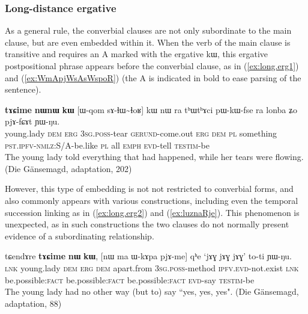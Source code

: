 \documentclass[oldfontcommands,oneside,a4paper,11pt]{article}
\newcommand{\ipa}[1]{{\phon \mbox{#1}}} %
\newcommand{\refb}[1]{(\ref{#1})}
\begin{document}
\subsubsection{Long-distance ergative}
As a general rule, the converbial clauses are not only subordinate to the main clause, but are even embedded within it. When the verb of the main clause is transitive and requires an A marked with the ergative \ipa{kɯ}, this ergative postpositional  phrase appears before the converbial clause, as in \refb{ex:long.erg1} and \refb{ex:WmApjWsAsWspoR} (the A is indicated in bold to ease parsing of the sentence).

\begin{exe}
\ex \label{ex:long.erg1}
\gll 
\ipa{\textbf{tɤɕime}} 	\ipa{\textbf{nɯnɯ}} 	\ipa{\textbf{kɯ}} 	[\ipa{ɯ-qom} 	\ipa{sɤ-ɬɯ\textasciitilde{}ɬoʁ}] 	\ipa{kɯ} 	\ipa{nɯ} \ipa{ra} 	\ipa{tʰɯtʰɤci} 	\ipa{pɯ-kɯ-fse} 	\ipa{ra} 	\ipa{lonba} 	\ipa{ʑo} 	\ipa{pjɤ-fɕɤt} 	\ipa{ɲɯ-ŋu.} 	\\
young.lady \textsc{dem} \textsc{erg} \textsc{3sg.poss}-tear \textsc{gerund}-come.out \textsc{erg} \textsc{dem} \textsc{pl} something \textsc{pst.ipfv-nmlz}:S/A-be.like \textsc{pl} all \textsc{emph} \textsc{evd}-tell \textsc{testim}-be \\
\glt The young lady told everything that had happened, while her tears were flowing. (Die Gänsemagd, adaptation, 202)
\end{exe}

However, this type of embedding is not not restricted to converbial forms, and also commonly appears with various constructions, including even the temporal succession linking as in \refb{ex:long.erg2} and \refb{ex:luznaRje}. This phenomenon is unexpected, as in such constructions the two clauses do not normally present evidence of a subordinating relationship.

\begin{exe}
\ex \label{ex:long.erg2}
\gll 
\ipa{tɕendɤre} 	\ipa{\textbf{tɤɕime}} 	\ipa{\textbf{nɯ}} 	\ipa{\textbf{kɯ},} 	[\ipa{nɯ} 	\ipa{ma} 	\ipa{ɯ-kɤpa} 	\ipa{pjɤ-me}] 	\ipa{qʰe} 	`\ipa{jɤɣ} 	\ipa{jɤɣ} 	\ipa{jɤɣ}' 	\ipa{to-ti} 	\ipa{ɲɯ-ŋu.} \\
\textsc{lnk} young.lady \textsc{dem} \textsc{erg} \textsc{dem}  apart.from \textsc{3sg.poss}-method \textsc{ipfv.evd}-not.exist \textsc{lnk} be.possible:\textsc{fact} be.possible:\textsc{fact} be.possible:\textsc{fact} \textsc{evd}-say \textsc{testim}-be \\
\glt The young lady had no other way (but to) say ``yes, yes, yes". (Die Gänsemagd, adaptation, 88)
\end{exe}
\end{document}
